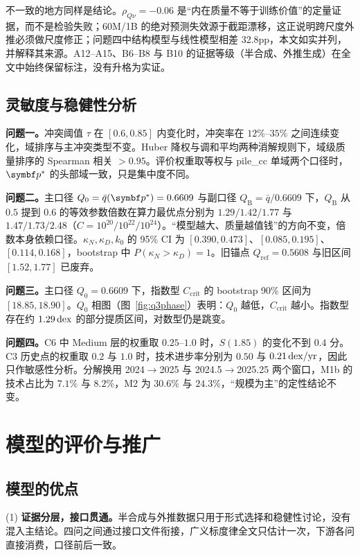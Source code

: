 不一致的地方同样是结论。$\rho_{Q\nu}=-0.06$ 是“内在质量不等于训练价值”的定量证据，而不是检验失败；60M/1B 的绝对预测失效源于截距漂移，这正说明跨尺度外推必须做尺度修正；问题四中结构模型与线性模型相差 32.8pp，本文如实并列，并解释其来源。A12–A15、B6–B8 与 B10 的证据等级（半合成、外推生成）在全文中始终保留标注，没有升格为实证。

\subsection{灵敏度与稳健性分析}

\textbf{问题一。}冲突阈值 $\tau$ 在 $[0.6,0.85]$ 内变化时，冲突率在 $12\%$–$35\%$ 之间连续变化，域排序与主冲突类型不变。Huber 降权与调和平均两种消解规则下，域级质量排序的 Spearman 相关 $>0.95$。评价权重取等权与 pile\_cc 单域两个口径时，$\bp^*$ 的头部域一致，只是集中度不同。

\textbf{问题二。}主口径 $Q_0=\bar q(\bp^*)=0.6609$ 与副口径 $Q_{\mathrm B}=\bar q/0.6609$ 下，$Q_{\mathrm B}$ 从 $0.5$ 提到 $0.6$ 的等效参数倍数在算力最优点分别为 $1.29/1.42/1.77$ 与 $1.47/1.73/2.48$（$C=10^{20}/10^{22}/10^{24}$）。“模型越大、质量越值钱”的方向不变，倍数本身依赖口径。$\kappa_N,\kappa_D,k_0$ 的 95\% CI 为 $[0.390,0.473]$、$[0.085,0.195]$、$[0.114,0.168]$，bootstrap 中 $P(\kappa_N>\kappa_D)=1$。旧锚点 $Q_{\mathrm{ref}}=0.5608$ 与旧区间 $[1.52,1.77]$ 已废弃。

\textbf{问题三。}主口径 $Q_0=0.6609$ 下，指数型 $C_{\mathrm{crit}}$ 的 bootstrap 90\% 区间为 $[18.85,18.90]$。$Q_0$ 相图（图~\ref{fig:q3phase}）表明：$Q_0$ 越低，$C_{\mathrm{crit}}$ 越小。指数型存在约 $1.29\,\mathrm{dex}$ 的部分提质区间，对数型仍是跳变。

\textbf{问题四。}C6 中 Medium 层的权重取 $0.25$–$1.0$ 时，$S(1.85)$ 的变化不到 $0.4$ 分。C3 历史点的权重取 $0.2$ 与 $1.0$ 时，技术进步率分别为 $0.50$ 与 $0.21\,\mathrm{dex}/\mathrm{yr}$，因此只作敏感性分析。分解换用 2024$\to$2025 与 2024.5$\to$2025.25 两个窗口，M1b 的技术占比为 $7.1\%$ 与 $8.2\%$，M2 为 $30.6\%$ 与 $24.3\%$，“规模为主”的定性结论不变。

\section{模型的评价与推广}

\subsection{模型的优点}

(1) \textbf{证据分层，接口贯通。}半合成与外推数据只用于形式选择和稳健性讨论，没有混入主结论。四问之间通过接口文件衔接，广义标度律全文只估计一次，下游各问直接消费，口径前后一致。

